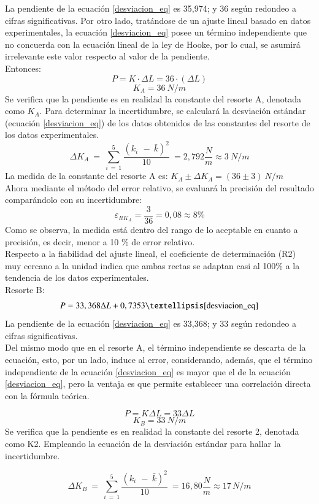 \documentclass[../main.tex]{subfiles}
\begin{document}
La pendiente de la ecuación \ref{desviacion_eq} es 35,974; y 36 según redondeo a cifras significativas. 
Por otro lado, tratándose de un ajuste lineal basado en datos experimentales, la ecuación \ref{desviacion_eq} 
posee un término independiente que no concuerda con la ecuación lineal de la ley de
Hooke, por lo cual, se asumirá irrelevante este valor respecto al valor de la pendiente.\\
Entonces:
\[P = K \cdot \Delta L = 36 \cdot (\Delta L) \]
\[K_A=36\ N/m\]
Se verifica que la pendiente es en realidad la constante del resorte A, denotada como 
$K_A$.
Para determinar la incertidumbre, se calculará la desviación estándar (ecuación \ref{desviacion_eq}) de los
datos obtenidos de las constantes del resorte de los datos experimentales.
\[\Delta K_A\ =\ \sum_{i\ =\ 1}^{5}\frac{{(k_{i\ }\ -\ \bar{k})}^2}{10}\ =2,792\frac{N}{m}\approx3\ N/m\]
La medida de la constante del resorte A es: $K_A \pm \Delta K_A=(36\pm 3)\ N/m$\\
Ahora mediante el método del error relativo, se evaluará la precisión del resultado comparándolo con su incertidumbre:
\[\varepsilon_{RK_A} = \frac{3}{36} = 0,08 \approx 8\%\]
Como se observa, la medida está dentro del rango de lo aceptable en cuanto a precisión, 
es decir, menor a 10 \% de error relativo.\\
Respecto a la fiabilidad del ajuste lineal, el coeficiente de determinación (R2) muy 
cercano a la unidad indica que ambas rectas se adaptan casi al 100\% a la tendencia
de los datos experimentales.\\
Resorte B:
\[P=33,368 \Delta L+0,7353…\ref{desviacion_eq}\]
La pendiente de la ecuación \ref{desviacion_eq} es 33,368; y 33 según redondeo a cifras significativas. \\
Del mismo modo que en el resorte A, el término independiente se descarta de la 
ecuación, esto, por un lado, induce al error, considerando, además, que el término
independiente de la ecuación \ref{desviacion_eq} es mayor que el de la ecuación \ref{desviacion_eq},
pero la ventaja es que permite establecer una correlación directa con la fórmula teórica.

\[P=K \Delta L=33 \Delta L\]
\[K_B=33\ N/m\]
Se verifica que la pendiente es en realidad la constante del resorte 2, denotada como K2.
Empleando la ecuación de la desviación estándar para hallar la incertidumbre.

\[\Delta K_B\ =\ \sum_{i\ =\ 1}^{5}\frac{{(k_{i\ }\ -\ \bar{k})}^2}{10}\ =16,80\frac{N}{m}\approx 17 \, N/m\]
\end{document}
